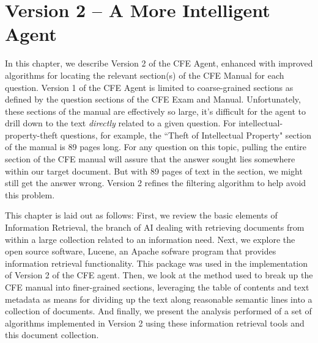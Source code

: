  
\chapter{Version 2 -- A More Intelligent Agent}

In this chapter, we describe Version 2 of the CFE Agent, enhanced with improved algorithms for locating the relevant section(s) of the CFE Manual for each question.  Version 1 of the CFE Agent is limited to coarse-grained sections as defined by the question sections of the CFE Exam and Manual.  Unfortunately, these sections of the manual are effectively so large, it's difficult for the agent to drill down to the text \emph{directly} related to a given question.  For intellectual-property-theft questions, for example, the ``Theft of Intellectual Property" section of the manual is 89 pages long.  For any question on this topic, pulling the entire section of the CFE manual will assure that the answer sought lies somewhere within our target document.  But with 89 pages of text in the section, we might still get the answer wrong.  Version 2 refines the filtering algorithm to help avoid this problem.



This chapter is laid out as follows:  First, we review the basic elements of Information Retrieval, the branch of AI dealing with retrieving documents from within a large collection related to an information need.  Next, we explore the open source software, Lucene, an Apache sofware program that provides information retrieval functionality.  This package was used in the implementation of Version 2 of the CFE agent.  Then, we look at the method used to break up the CFE manual into finer-grained sections, leveraging the table of contents and text metadata as means for dividing up the text along reasonable semantic lines into a collection of documents.  And finally, we present the analysis performed of a set of algorithms implemented in Version 2 using these information retrieval tools and this document collection.

